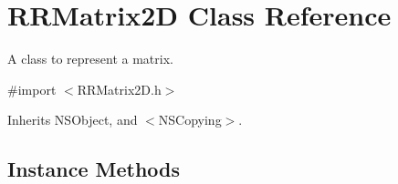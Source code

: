 \hypertarget{interface_r_r_matrix2_d}{\section{R\-R\-Matrix2\-D Class Reference}
\label{interface_r_r_matrix2_d}
}


A class to represent a matrix.  




{\ttfamily \#import $<$R\-R\-Matrix2\-D.\-h$>$}



Inherits N\-S\-Object, and $<$\-N\-S\-Copying$>$.

\subsection*{Instance Methods}
